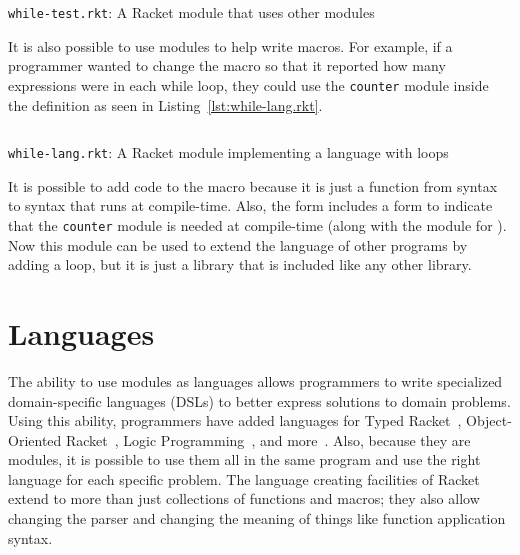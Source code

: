 \begin{listing}
  \inputminted{racket}{listings/while-test.rkt}
  \caption{\texttt{while-test.rkt}: A Racket module that uses other modules}
  \label{lst:while-test.rkt}
\end{listing}

It is also possible to use modules to help write macros.
For example, if a programmer wanted to change the  macro so that it reported how many expressions were in each while loop, they could use the \texttt{counter} module inside the  definition as seen in Listing~\ref{lst:while-lang.rkt}.
\begin{listing}
  \inputminted{racket}{listings/while-lang.rkt}
  \caption{\texttt{while-lang.rkt}: A Racket module implementing a language with  loops}
  \label{lst:while-lang.rkt}
\end{listing}
It is possible to add code to the  macro because it is just a function from syntax to syntax that runs at compile-time. 
Also, the  form includes a  form to indicate that the \texttt{counter} module is needed at compile-time (along with the  module for ).
Now this module can be used to extend the language of other programs by adding a  loop, but it is just a library that is included like any other library.

\section{Languages}
The ability to use modules as languages allows programmers to write specialized domain-specific languages (DSLs) to better express solutions to domain problems. 
Using this ability, programmers have added languages for Typed Racket~\cite{}, Object-Oriented Racket~\cite{}, Logic Programming~\cite{}, and more~\cite{}.
Also, because they are modules, it is possible to use them all in the same program and use the right language for each specific problem.
The language creating facilities of Racket extend to more than just collections of functions and macros; they also allow changing the parser and changing the meaning of things like function application syntax. 

